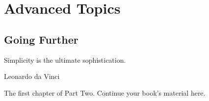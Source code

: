 \part{Advanced Topics}

\chapter{Going Further}
\label{chapter:going-further}

\epigraph{Simplicity is the ultimate sophistication.}{Leonardo da Vinci}

The first chapter of Part Two. Continue your book's material here.
